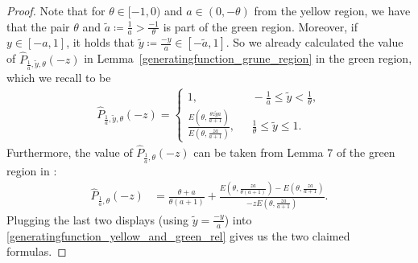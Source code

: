 \documentclass[12pt]{article}
\newcommand{\1}{\mathds{1}}
\theoremstyle{definition}
\theoremstyle{plain}
\theoremstyle{remark}
\begin{document}
\begin{proof}
    Note that for $\theta\in[-1,0)$ and $a\in(0,-\theta)$ from the yellow region, we have that the pair $\theta$ and $\tilde{a}\coloneqq\frac{1}{a}>\frac{-1}{\theta}$ is part of the green region. Moreover, if $y\in[-a,1]$, it holds that $\tilde{y}\coloneqq\frac{-y}{a}\in[-\tilde{a},1]$. So we already calculated the value of $\hat{P}_{\frac{1}{a},\tilde{y},\theta}(-z)$ in Lemma~\ref{generatingfunction_grune_region} in the green region, which we recall to be
    \begin{align*}
        \hat{P}_{\frac{1}{a},\tilde{y},\theta}(-z)
        = \begin{cases}
            1,~~&~-\frac{1}{a}\leq \tilde{y}<\frac{1}{\theta},
            \\\frac{E\left(\theta,\frac{\theta z\tilde{y}a}{a+1}\right)}{E\left(\theta,\frac{za}{a+1}\right)},~~&~\frac{1}{\theta}\leq \tilde{y} \leq 1.
        \end{cases} 
    \end{align*}
   Furthermore, the value of $\hat{P}_{\frac{1}{a},\theta}(-z)$ can be taken from Lemma 7 of the green region in \cite{AurzadaRaschel}:
    \begin{align*}
        \hat{P}_{\frac{1}{a},\theta}(-z)
        &=\frac{\theta +a}{\theta(a+1)}+\frac{E\left(\theta,\frac{za}{\theta(a+1)}\right)-E\left(\theta,\frac{za}{a+1}\right)}{-zE\left(\theta,\frac{za}{a+1}\right)}.
    \end{align*}
     Plugging the last two displays (using $\tilde y=\frac{-y}{a}$) into \eqref{generatingfunction_yellow_and_green_rel} gives us the two claimed formulas.

\end{proof}
\end{document}
